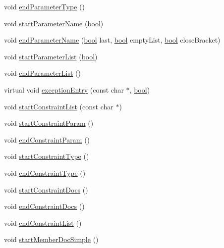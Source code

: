 \begin{DoxyCompactItemize}
void \hyperlink{class_html_generator_a7acf2aede403e63af3a43d412894a480}{end\+Parameter\+Type} ()
\item 
void \hyperlink{class_html_generator_a8da2ad5820039d49072240e3e1bdd582}{start\+Parameter\+Name} (\hyperlink{qglobal_8h_a1062901a7428fdd9c7f180f5e01ea056}{bool})
\item 
void \hyperlink{class_html_generator_abd64a3a25b75672c9944ec32d014f55a}{end\+Parameter\+Name} (\hyperlink{qglobal_8h_a1062901a7428fdd9c7f180f5e01ea056}{bool} last, \hyperlink{qglobal_8h_a1062901a7428fdd9c7f180f5e01ea056}{bool} empty\+List, \hyperlink{qglobal_8h_a1062901a7428fdd9c7f180f5e01ea056}{bool} close\+Bracket)
\item 
void \hyperlink{class_html_generator_aaec3b60d1bf3226721458402a321c9fe}{start\+Parameter\+List} (\hyperlink{qglobal_8h_a1062901a7428fdd9c7f180f5e01ea056}{bool})
\item 
void \hyperlink{class_html_generator_a09ba0b9e2623bb31767342f4a8834451}{end\+Parameter\+List} ()
\item 
virtual void \hyperlink{class_html_generator_a74f27361593c1219f23c3b9f0cb49e66}{exception\+Entry} (const char $\ast$, \hyperlink{qglobal_8h_a1062901a7428fdd9c7f180f5e01ea056}{bool})
\item 
void \hyperlink{class_html_generator_aa5851d60541e79c0a0539e7206d85803}{start\+Constraint\+List} (const char $\ast$)
\item 
void \hyperlink{class_html_generator_aac02dbee22fe7d3ff29081b4833981aa}{start\+Constraint\+Param} ()
\item 
void \hyperlink{class_html_generator_ae0379d1142e0189d0f4a1d236b76501c}{end\+Constraint\+Param} ()
\item 
void \hyperlink{class_html_generator_a6fefa778c71da8dc9bd4a28461a1da52}{start\+Constraint\+Type} ()
\item 
void \hyperlink{class_html_generator_af424c10d553610d4a099e533632db5a8}{end\+Constraint\+Type} ()
\item 
void \hyperlink{class_html_generator_a5ec6842686db43cbb2eb75eaef551472}{start\+Constraint\+Docs} ()
\item 
void \hyperlink{class_html_generator_a5bd3b6d393908c6fd052f52658df64bf}{end\+Constraint\+Docs} ()
\item 
void \hyperlink{class_html_generator_aaa12c82f9806096e567f4441e89b4fbc}{end\+Constraint\+List} ()
\item 
void \hyperlink{class_html_generator_a852efa4f8d249b6dc242be737f078be4}{start\+Member\+Doc\+Simple} ()
\item 

\end{DoxyCompactItemize}
